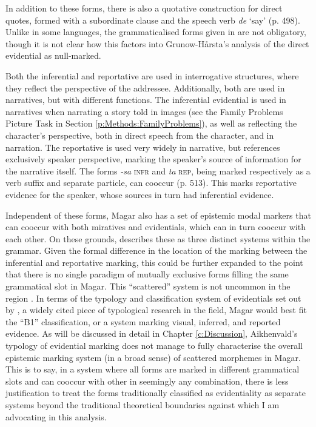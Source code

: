 In addition to these forms, there is also a quotative construction for direct quotes, formed with a subordinate clause and the speech verb \textit{de} `say' (p. 498). Unlike in some languages, the grammaticalised forms given in  are not obligatory, though it is not clear how this factors into Grunow-Hårsta's analysis of the direct evidential as null-marked.

Both the inferential and reportative are used in interrogative structures, where they reflect the perspective of the addressee. Additionally, both are used in narratives, but with different functions. The inferential evidential is used in narratives when narrating a story told in images (see the Family Problems Picture Task in Section \ref{p:Methods:FamilyProblems}), as well as reflecting the character's perspective, both in direct speech from the character, and in narration. The reportative is used very widely in narrative, but references exclusively speaker perspective, marking the speaker's source of information for the narrative itself. The forms \textit{-sa} \textsc{infr} and \textit{ta} \textsc{rep}, being marked respectively as a verb suffix and separate particle, can cooccur (p. 513). This marks reportative evidence for the speaker, whose sources in turn had inferential evidence.

Independent of these forms, Magar also has a set of epistemic modal markers that can cooccur with both miratives and evidentials, which can in turn cooccur with each other. On these grounds,  describes these as three distinct systems within the grammar. Given the formal difference in the location of the marking between the inferential and reportative marking, this could be further expanded to the point that there is no single paradigm of mutually exclusive forms filling the same grammatical slot in Magar. This ``scattered'' system is not uncommon in the region \cite[480-481]{GrunowHarsta2008}. In terms of the typology and classification system of evidentials set out by , a widely cited piece of typological research in the field, Magar would best fit the ``B1'' classification, or a system marking visual, inferred, and reported evidence. As will be discussed in detail in Chapter \ref{c:Discussion}, Aikhenvald's typology of evidential marking does not manage to fully characterise the overall epistemic marking system (in a broad sense) of scattered morphemes in Magar. This is to say, in a system where all forms are marked in different grammatical slots and can cooccur with other in seemingly any combination, there is less justification to treat the forms traditionally classified as evidentiality as separate systems beyond the traditional theoretical boundaries against which I am advocating in this analysis.

